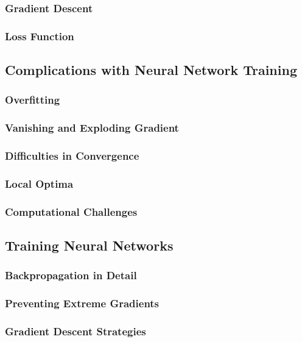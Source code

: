 \documentclass[titlepage]{article}
\begin{document}
\subsubsection{Gradient Descent}
\subsubsection{Loss Function}

\newpage

\subsection{Complications with Neural Network Training}
\subsubsection{Overfitting}
\subsubsection{Vanishing and Exploding Gradient}
\subsubsection{Difficulties in Convergence}
\subsubsection{Local Optima}
\subsubsection{Computational Challenges}

\newpage

\subsection{Training Neural Networks}
\subsubsection{Backpropagation in Detail}
\subsubsection{Preventing Extreme Gradients}
\subsubsection{Gradient Descent Strategies}
\end{document}

